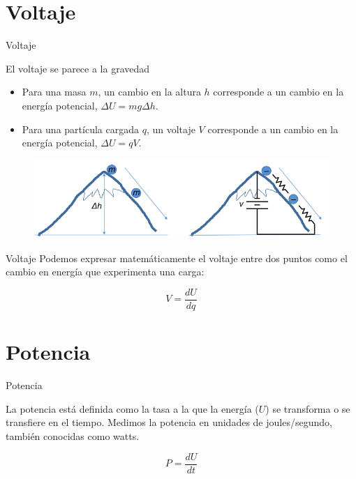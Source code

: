 \documentclass[10pt]{beamer}
\begin{document}
\section{Voltaje}

\begin{frame}{Voltaje}{}
\begin{block}{El voltaje se parece a la gravedad}
\begin{itemize}
    \item Para una masa $m$, un cambio en la altura $h$ corresponde a un cambio en la energía potencial, $\Delta U = mg\Delta h$.
    \item Para una partícula cargada $q$, un voltaje $V$ corresponde a un cambio en la energía potencial, $\Delta U = qV$.
\end{itemize}
\end{block}

\begin{figure}[h!]
\centering
\includegraphics [scale=0.39]{mountvolt}
\label{fig:first}
\end{figure}

\end{frame}

\begin{frame}{Voltaje}{}
Podemos expresar matemáticamente el voltaje entre dos puntos como el cambio en energía que experimenta una carga:

\begin{equation}
    V = \frac{dU}{dq}
\end{equation}
\end{frame}

\section{Potencia}

\begin{frame}{Potencia}{}
\begin{block}{}
La potencia está definida como la tasa a la que la energía ($U$) se transforma o se transfiere en el tiempo. Medimos la potencia en unidades de joules/segundo, también conocidas como watts.

\begin{equation}
    P = \frac{dU}{dt}
\end{equation}
\end{block}

\end{frame}
\end{document}

